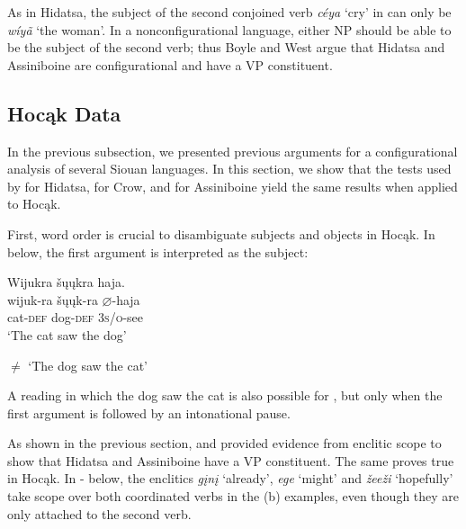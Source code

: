 \documentclass[output=paper]{LSP/langsci}
\begin{document}
As in Hidatsa, the subject of the second conjoined verb \textit{c\'eya} `cry' in  can only be \textit{w\'iy\~a} `the woman'.  In a nonconfigurational language, either NP should be able to be the subject of the second verb; thus Boyle and West argue that Hidatsa and Assiniboine are configurational and have a VP constituent.

\subsection{Hocąk Data}

In the previous subsection, we presented previous arguments for a configurational analysis of several Siouan languages.  In this section, we show that the tests used by \citet{Boyle2007} for Hidatsa, \citet{Graczyk1991a} for Crow, and \citet{West2003} for Assiniboine yield the same results when applied to Hocąk.
	
First, word order is crucial to disambiguate subjects and objects in Hocąk.  In  below, the first argument is interpreted as the subject:

\begin{exe}
\ex\label{ex:jrs:31} 
\glll Wijukra	\v{s}\k{u}\k{u}kra 		haja.\\
wijuk-ra 		\v{s}\k{u}\k{u}k-ra 		$\varnothing$-haja \\
cat-\textsc{def} 		dog-\textsc{def} 	\textsc{3s/o}-see \\
\trans `The cat saw the dog'

$\neq$ `The dog saw the cat'
\end{exe}

A reading in which the dog saw the cat is also possible for , but only when the first argument is followed by an intonational pause.
	
As shown in the previous section, \citet{Boyle2007} and \citet{West2003} provided evidence from enclitic scope to show that Hidatsa and Assiniboine have a VP constituent.  The same proves true in Hocąk.  In - below, the enclitics \textit{g\k{i}n\k{i}} `already', \textit{ege} `might' and \textit{\v{z}ee\v{z}i} `hopefully' take scope over both coordinated verbs in the (b) examples, even though they are only attached to the second verb.
\end{document}
